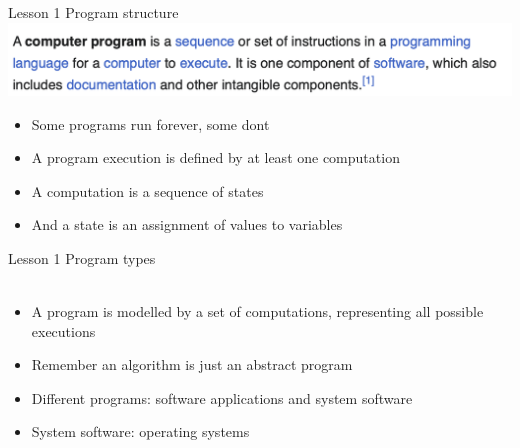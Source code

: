 \documentclass[aspectratio=1610]{beamer}
\begin{document}
\begin{frame}{Lesson 1}{}
{\Huge{Program structure}}
\includegraphics[scale=0.67]{Images/program}

\Large{
\begin{itemize}
    \item Some programs run forever, some dont
    \item A program execution is defined by at least one computation
    \item A computation is a sequence of states
    \item And a state is an assignment of values to variables
\end{itemize}}

\end{frame}


\begin{frame}{Lesson 1}{}
{\Huge{Program types}}\\~\\ 

\Large{
\begin{itemize}
    \item A program is modelled by a set of computations, representing all possible executions
    \item Remember an algorithm is just an abstract program
    \item Different programs: software applications and system software
    \item System software: operating systems
\end{itemize}}
\end{frame}
\end{document}
